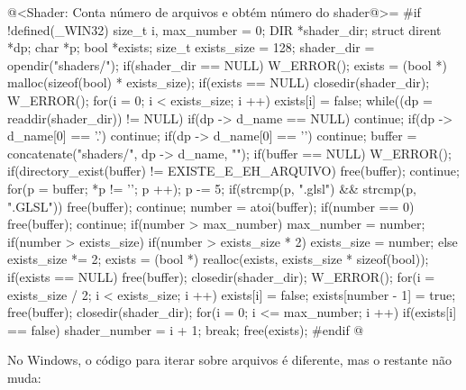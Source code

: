{\iniciocodigo
@<Shader: Conta número de arquivos e obtém número do shader@>=
#if !defined(_WIN32)
{
  size_t i, max_number = 0;
  DIR *shader_dir;
  struct dirent *dp;
  char *p;
  bool *exists;
  size_t exists_size = 128;
  shader_dir = opendir("shaders/");
  if(shader_dir == NULL)
    W_ERROR();
  exists = (bool *) malloc(sizeof(bool) * exists_size);
  if(exists == NULL){
    closedir(shader_dir);
    W_ERROR();
  }
  for(i = 0; i < exists_size; i ++)
    exists[i] = false;
  while((dp = readdir(shader_dir)) != NULL){
    if(dp -> d_name == NULL) continue;
    if(dp -> d_name[0] == '.') continue;
    if(dp -> d_name[0] == '\0') continue;
    buffer = concatenate("shaders/", dp -> d_name, "");
    if(buffer == NULL) W_ERROR();
    if(directory_exist(buffer) != EXISTE_E_EH_ARQUIVO){
      free(buffer);
      continue;
    }
    for(p = buffer; *p != '\0'; p ++);
    p -= 5;
    if(strcmp(p, ".glsl") && strcmp(p, ".GLSL")){
      free(buffer);
      continue;
    }
    number = atoi(buffer);
    if(number == 0){
      free(buffer);
      continue;
    }
    if(number > max_number)
      max_number = number;
    if(number > exists_size){
      if(number > exists_size * 2)
        exists_size = number;
      else
        exists_size *= 2;
      exists = (bool *) realloc(exists, exists_size * sizeof(bool));
      if(exists == NULL){
        free(buffer);
        closedir(shader_dir);
        W_ERROR();
      }
      for(i = exists_size / 2; i < exists_size; i ++)
        exists[i] = false;
    }
    exists[number - 1] = true;
    free(buffer);
  }
  closedir(shader_dir);
  for(i = 0; i <= max_number; i ++)
    if(exists[i] == false){
      shader_number = i + 1;
      break;
    }
  free(exists);
}
#endif
@
\fimcodigo

No Windows, o código para iterar sobre arquivos é diferente, mas o
restante não muda:

}
